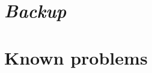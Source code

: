 \begin{appendix}
\begin{comment}
%

\chapter{\textit{Migration of the \appName\ system}}

\end{comment}
\chapter{\textit{Backup}}


\chapter{Known problems}
\label{chap:knownProblems}


%

\end{appendix}
